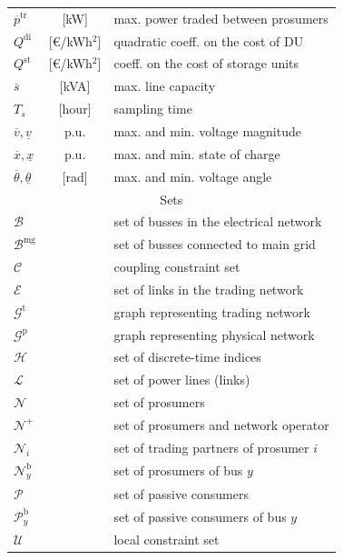 \documentclass{IEEEtran}  %
\newcommand{\mc}{\mathcal}
\newcommand{\0}{\mathbf{0}}
\newcommand{\1}{\mathbf{1}}
\begin{document}
\begin{table}[!h]
\begin{tabular}{l c l}
		$\overline{p}^{\mathrm{tr}}$ &[kW]  & max. power traded between prosumers \\
		$Q^{\mathrm{di}}$ &[\euro/kWh$^2$] & quadratic coeff. on the cost of DU \\
		$Q^{\mathrm{st}}$ & [\euro/kWh$^2$]& coeff. on the cost of storage units \\
		$\overline{s}$ & [kVA] & max. line capacity \\
		$T_s$ & [hour] & sampling time \\
		$\overline{v}, \underline{v}$ & p.u. & max. and min. voltage magnitude \\
		$\overline{x},\underline{x}$ &p.u. & max. and min. state of charge \\
		$\overline{\theta}, \underline{\theta}$ & [rad] & max. and min. voltage angle \\
		\hline
		\toprule
		\multicolumn{3}{c}{Sets}  \\
		\hline 
		$\mc B$ & & set of busses in the electrical network \\
		$\mc B^{\mathrm{mg}}$ & & set of busses connected to main grid\\
		$\mathcal{C}$ & & coupling constraint set \\
		$\mc E$ & & set of links in the trading network\\
		$\mathcal{G}^{\mathrm{t}}$ & & graph representing trading network \\
		$\mathcal{G}^{\mathrm{p}}$ & & graph representing physical network \\
		$\mc H$ & & set of discrete-time indices \\
		$\mc L$ & & set of power lines (links)\\
		$\mathcal{N}$ & & set of prosumers \\
		$\mathcal{N}^+$ & & set of prosumers and network operator\\
		$\mathcal{N}_i$ & & set of trading partners of prosumer $i$ \\
		$\mathcal{N}_y^{\mathrm{b}}$ & & set of prosumers of bus $y$ \\
		$\mc P$ & & set of passive consumers \\
		$\mc P_y^{\mathrm{b}}$& &set of passive consumers of bus $y$ \\
		$\mathcal{U}$ & & local constraint set \\ 
		\bottomrule
		
	\end{tabular}
	
\end{table} 
\end{document}
